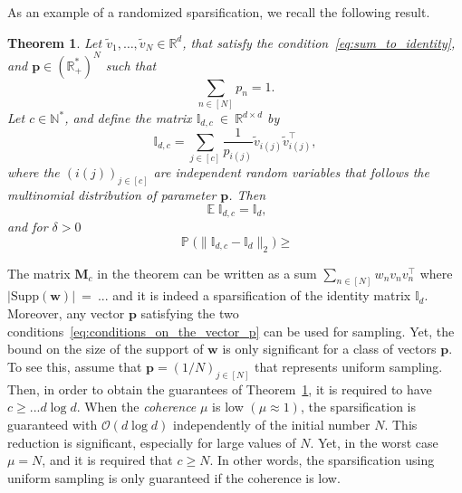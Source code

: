 \documentclass[twoside,11pt]{book}
\newtheorem{theorem}{Theorem}
\numberwithin{theorem}{chapter}
\numberwithin{definition}{chapter}
\numberwithin{proposition}{chapter}
\numberwithin{corollary}{chapter}
\numberwithin{example}{chapter}
\numberwithin{lemma}{chapter}
\numberwithin{assumption}{chapter}
\DeclareMathOperator{\Tran}{\intercal}
\DeclareMathOperator{\EX}{\mathbb{E}}
\DeclareMathOperator{\Prb}{\mathbb{P}}
\begin{document}
As an example of a randomized sparsification, we recall the following result.




\begin{theorem}\label{thm:matrix_bernstein_identity_sparsification}
Let $\tilde{v}_{1}, \dots, \tilde{v}_{N} \in \mathbb{R}^{d}$, that satisfy the condition~\eqref{eq:sum_to_identity}, and
$\bm{p} \in (\mathbb{R}_{+}^{*})^{N}$ such that
\begin{equation}
\sum\limits_{n \in [N]} p_{n} = 1.
\end{equation}
Let $c \in \mathbb{N}^{*}$, and define the matrix $\mathbb{I}_{d,c}~\in~\mathbb{R}^{d\times d}$ by
\begin{equation}
\mathbb{I}_{d,c} = \sum\limits_{j \in [c]} \frac{1}{p_{i(j)}}\tilde{v}_{i(j)}^{\phantom{\Tran}}\tilde{v}_{i(j)}^{\Tran},
\end{equation} 
where
the $(i(j))_{j \in [c]}$ are independent random variables that follows the multinomial distribution of parameter $\bm{p}$. Then
\begin{equation}
\EX \mathbb{I}_{d,c} = \mathbb{I}_{d},
\end{equation}
and for $\delta >0$
\begin{equation}
\Prb \bigg( \|\mathbb{I}_{d,c} - \mathbb{I}_{d}\|_{2} \bigg) \geq 
\end{equation}




\end{theorem}

The matrix $\bm{M}_{c}$ in the theorem can be written as a sum $\displaystyle \sum\limits_{n \in [N]}w_{n}v_{n}v_{n}^{\Tran}$ where $|\mathrm{Supp}(\bm{w})|~=~...$ and it is indeed a sparsification of the identity matrix $\mathbb{I}_{d}$. Moreover, any vector $\bm{p}$ satisfying the two conditions~\eqref{eq:conditions_on_the_vector_p} can be used for sampling. Yet, the bound on the size of the support of $\bm{w}$ is only significant for a class of vectors $\bm{p}$. To see this, assume that $\bm{p} = (1/N)_{j \in [N]}$ that represents uniform sampling. Then, in order to obtain the guarantees of Theorem~\ref{thm:matrix_bernstein_identity_sparsification}, it is required to have  $c \geq ... d \log d $. When the \emph{coherence} $\mu$ is low $(\mu \approx 1)$, the sparsification is guaranteed with $\mathcal{O}(d \log d)$ independently of the initial number $N$. This reduction is significant, especially for large values of $N$. Yet, in the worst case $\mu = N$, and it is required that $c \geq N$. In other words, the sparsification using uniform sampling is only guaranteed if the coherence is low.
\end{document}
